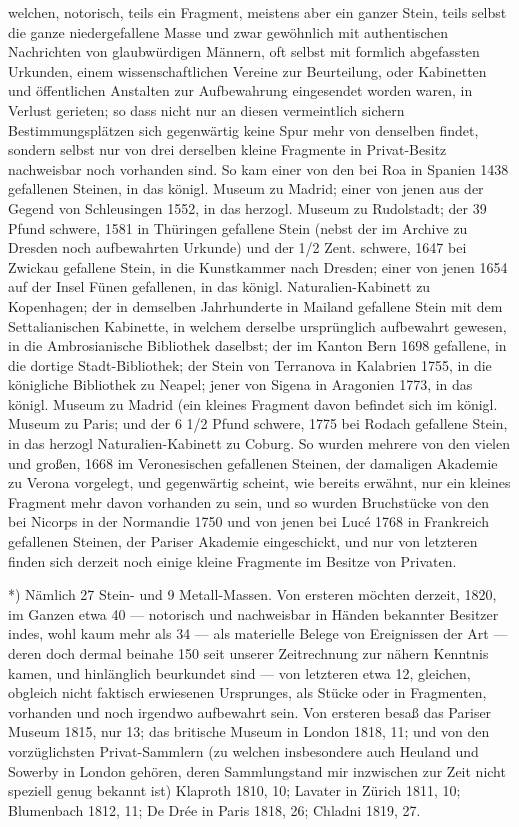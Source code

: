\documentclass[a4paper, 11pt, oneside, german]{article}
\begin{document}
welchen, notorisch, teils ein Fragment, meistens aber ein ganzer Stein, teils selbst die ganze niedergefallene Masse und zwar gewöhnlich mit authentischen Nachrichten von glaubwürdigen Männern, oft selbst mit formlich abgefassten Urkunden, einem wissenschaftlichen Vereine zur Beurteilung, oder Kabinetten und öffentlichen Anstalten zur Aufbewahrung eingesendet worden waren, in Verlust gerieten; so dass nicht nur an diesen vermeintlich sichern Bestimmungsplätzen sich gegenwärtig keine Spur mehr von denselben findet, sondern selbst nur von drei derselben kleine Fragmente in Privat-Besitz nachweisbar noch vorhanden sind. So kam einer von den bei Roa in Spanien 1438 gefallenen Steinen, in das königl. Museum zu Madrid; einer von jenen aus der Gegend von Schleusingen 1552, in das herzogl. Museum zu Rudolstadt; der 39 Pfund schwere, 1581 in Thüringen gefallene Stein (nebst der im Archive zu Dresden noch aufbewahrten Urkunde) und der 1/2 Zent. schwere, 1647 bei Zwickau gefallene Stein, in die Kunstkammer nach Dresden; einer von jenen 1654 auf der Insel Fünen gefallenen, in das königl. Naturalien-Kabinett zu Kopenhagen; der in demselben Jahrhunderte in Mailand gefallene Stein mit dem Settalianischen Kabinette, in welchem derselbe ursprünglich aufbewahrt gewesen, in die Ambrosianische Bibliothek daselbst; der im Kanton Bern 1698 gefallene, in die dortige Stadt-Bibliothek; der Stein von Terranova in Kalabrien 1755, in die königliche Bibliothek zu Neapel; jener von Sigena in Aragonien 1773, in das königl. Museum zu Madrid (ein kleines Fragment davon befindet sich im königl. Museum zu Paris; und der 6 1/2 Pfund schwere, 1775 bei Rodach gefallene Stein, in das herzogl Naturalien-Kabinett zu Coburg. So wurden mehrere von den vielen und großen, 1668 im Veronesischen gefallenen Steinen, der damaligen Akademie zu Verona vorgelegt, und gegenwärtig scheint, wie bereits erwähnt, nur ein kleines Fragment mehr davon vorhanden zu sein, und so wurden Bruchstücke von den bei Nicorps in der Normandie 1750 und von jenen bei Lucé 1768 in Frankreich gefallenen Steinen, der Pariser Akademie eingeschickt, und nur von letzteren finden sich derzeit noch einige kleine Fragmente im Besitze von Privaten.

*) Nämlich 27 Stein- und 9 Metall-Massen. Von ersteren möchten derzeit, 1820, im Ganzen etwa 40 --- notorisch und nachweisbar in Händen bekannter Besitzer indes, wohl kaum mehr als 34 --- als materielle Belege von Ereignissen der Art --- deren doch dermal beinahe 150 seit unserer Zeitrechnung zur nähern Kenntnis kamen, und hinlänglich beurkundet sind --- von letzteren etwa 12, gleichen, obgleich nicht faktisch erwiesenen Ursprunges, als Stücke oder in Fragmenten, vorhanden und noch irgendwo aufbewahrt sein. Von ersteren besaß das Pariser Museum 1815, nur 13; das britische Museum in London 1818, 11; und von den vorzüglichsten Privat-Sammlern (zu welchen insbesondere auch Heuland und Sowerby in London gehören, deren Sammlungstand mir inzwischen zur Zeit nicht speziell genug bekannt ist) Klaproth 1810, 10; Lavater in Zürich 1811, 10; Blumenbach 1812, 11; De Drée in Paris 1818, 26; Chladni 1819, 27.
\end{document}
